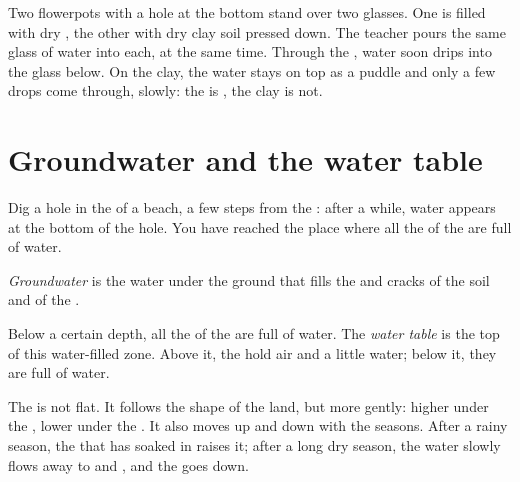 \begin{inthelab}
Two flowerpots with a hole at the bottom stand over two glasses. One is
filled with dry , the other with dry clay soil pressed down. The teacher
pours the same glass of water into each, at the same time. Through the
, water soon drips into the glass below. On the clay, the water stays
on top as a puddle and only a few drops come through, slowly: the  is
, the clay is not.
\end{inthelab}

\section{Groundwater and the water table}

Dig a hole in the  of a beach, a few steps from the : after a while,
water appears at the bottom of the hole. You have reached the place where
all the  of the  are full of water.

\begin{definition}[Groundwater]\label{def:g6:water-underground:groundwater}
\emph{Groundwater} is the water under the ground that
fills the  and cracks of the soil and of the .
\end{definition}

\begin{definition}\label{def:g6:water-underground:water-table}
Below a certain depth, all the  of the  are full of water. The
\emph{water table} is the top of this water-filled zone.
Above it, the  hold air and a little water; below it, they are full of
water.
\end{definition}

The  is not flat. It follows the shape of the land, but more
gently: higher under the , lower under the . It also moves up
and down with the seasons. After a rainy season, the  that has soaked
in raises it; after a long dry season, the water slowly flows away to
 and , and the  goes down.

